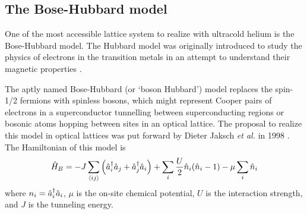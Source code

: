 	

\subsection{The Bose-Hubbard model}

	One of the most accessible lattice system to realize with ultracold helium is the Bose-Hubbard model.
	The Hubbard model was originally introduced to study the physics of electrons in the transition metals in an attempt to understand their magnetic properties \cite{SachdevQPT}.
	
	The aptly named Bose-Hubbard (or `boson Hubbard') model replaces the spin-1/2 fermions with spinless bosons, which might represent Cooper pairs of electrons in a superconductor tunnelling between superconducting regions \cite{SachdevQPT} or bosonic atoms hopping between sites in an optical lattice.
	The proposal to realize this model in optical lattices was put forward by Dieter Jaksch \emph{et al.} in 1998 \cite{Jaksch98}.
	The Hamiltonian of this model is 
	\begin{equation}
		\hat{H}_B = -J\sum_{\langle i j\rangle}\left(\hat{a}^\dagger_i\hat{a}_j+\hat{a}^\dagger_j\hat{a}_i\right) 
		+	\sum_{i} \frac{U}{2}\hat{n}_{i}(\hat{n}_{i}-1) 
		- \mu\sum_{i} \hat{n}_i
		\label{eqn:BH_ham}
	\end{equation}
	where $n_i = \hat{a}^\dagger_i\hat{a}_i$, $\mu$ is the on-site chemical potential, $U$ is the interaction strength, and $J$ is the tunneling energy.
	

